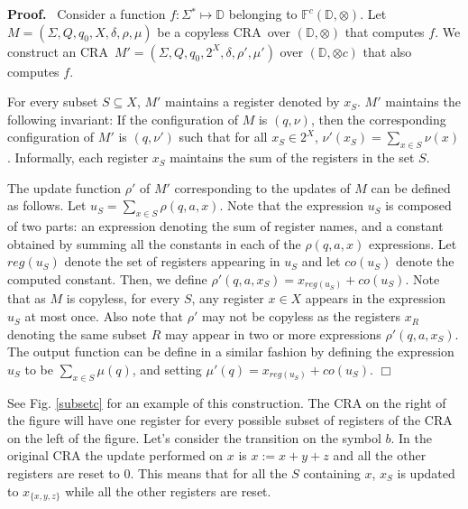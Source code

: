 \documentclass[11pt]{article}
\def\Proof{{\bf Proof.}}
\def\qed{{\bf $\Box$}}
\def\qed{{\bf $\Box$}}
\newcommand{\st}{\ensuremath{^*}}
\newcommand{\domain}{\ensuremath{\mathbb{D}}}
\newcommand{\CCF}{{\mathbb F}^c}
\newcommand{\inputalph}{\ensuremath{\Sigma}}
\newcommand{\valuation}{\ensuremath{\nu}}
\newcommand{\EDWA}{{CRA}\xspace}
\newcommand{\edwa}{\ensuremath{M}}
\newcommand{\edwastates}{\ensuremath{Q}}
\newcommand{\edwastate}{\ensuremath{q}}
\newcommand{\edwainitst}{\ensuremath{\edwastate_0}}
\newcommand{\edwavariables}{\ensuremath{X}}
\newcommand{\edwatrans}{\ensuremath{\delta}}
\newcommand{\edwavarup}{\ensuremath{\rho}}
\newcommand{\edwafinal}{\ensuremath{\mu}}
\newcommand{\setof}[1]{\{#1\}}
\def\myplus{\otimes}
\begin{document}
\Proof~ Consider a function $f:\Sigma\st\mapsto\domain$ belonging to
$\CCF(\domain,\myplus)$.  Let
$\edwa=(\inputalph,\edwastates,\edwainitst,\edwavariables,\edwatrans,\edwavarup,\edwafinal)$
be a copyless \EDWA~over $(\domain,\myplus)$ that computes $f$.  We
construct an
\EDWA~$\edwa'=(\inputalph,\edwastates,\edwainitst,2^\edwavariables,\edwatrans,\edwavarup',\edwafinal')$
over $(\domain,\myplus c)$ that also computes $f$.

For every subset $S\subseteq \edwavariables$, $\edwa'$ maintains a
register denoted by $x_S$.  $\edwa'$ maintains the following invariant: If
the configuration of $\edwa$ is $(\edwastate,\valuation)$, then the
corresponding configuration of $\edwa'$ is $(\edwastate,\valuation')$ such
that for all $x_S \in 2^\edwavariables$, $\valuation'(x_S)=\sum_{x\in S}
\valuation(x)$.  Informally, each register $x_S$ maintains the sum of the
registers in the set $S$.

The update function $\rho'$ of $\edwa'$ corresponding to the updates of
$\edwa$ can be defined as follows.  Let $u_S = \sum_{x\in S} \rho(q,a,x)$.
Note that the expression $u_S$ is composed of two parts: an expression
denoting the sum of register names, and a constant obtained by summing all
the constants in each of the $\rho(q,a,x)$ expressions. Let $reg(u_S)$
denote the set of registers appearing in $u_S$ and let $co(u_S)$ denote the
computed constant.  Then, we define $\rho'(q,a,x_S) = x_{reg(u_S)} +
co(u_S)$. Note that as $\edwa$ is copyless, for every $S$, any register $x
\in X$ appears in the expression $u_S$ at most once. Also note that
$\rho'$ may not be copyless as the registers $x_R$ denoting the same
subset $R$ may appear in two or more expressions $\rho'(q,a,x_S)$. The
output function can be define in a similar fashion by defining the
expression $u_S$ to be $\sum_{x\in S} \mu(q)$, and setting $\mu'(q) =
x_{reg(u_S)} + co(u_S)$.
\qed

See Fig. \ref{subsetc} for an example of this construction.  The CRA on
the right of the figure will have one register for every possible subset
of registers of the CRA on the left of the figure. Let's consider the
transition on the symbol $b$.  In the original CRA the update performed on
$x$ is $x:=x+y+z$ and all the other registers are reset to $0$.  This
means that for all the $S$ containing $x$, $x_S$ is updated to
$x_{\setof{x,y,z}}$ while all the other registers are reset.
\end{document}
